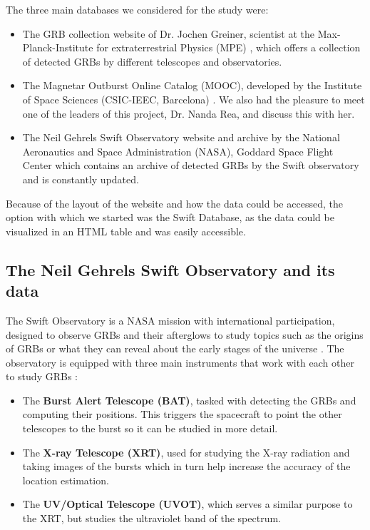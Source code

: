 The three main databases we considered for the study were:

\begin{itemize}
	\item The GRB collection website of Dr. Jochen Greiner, scientist at the Max-Planck-Institute for extraterrestrial Physics (MPE) \cite{greinergrb},  which offers a collection of detected GRBs by different telescopes and observatories.
	\item The Magnetar Outburst Online Catalog (MOOC), developed by the Institute of Space Sciences (CSIC-IEEC, Barcelona) \cite{moocgrbs}. We also had the pleasure to meet one of the leaders of this project, Dr. Nanda Rea, and discuss this with her.
	\item The Neil Gehrels Swift Observatory website and archive by the National Aeronautics and Space Administration (NASA), Goddard Space Flight Center \cite{swiftnasa} which contains an archive of detected GRBs by the Swift observatory and is constantly updated.
\end{itemize}

Because of the layout of the website and how the data could be accessed, the option with which we started was the Swift Database, as the data could be visualized in an HTML table and was easily accessible.

\subsection{The Neil Gehrels Swift Observatory and its data}

The Swift Observatory is a NASA mission with international participation, designed to observe GRBs and their afterglows to study topics such as the origins of GRBs or what they can reveal about the early stages of the universe \cite{roming2005swift}. The observatory is equipped with three main instruments that work with each other to study GRBs \cite{gehrels2004swift} \cite{swiftnasa}:

\begin{itemize}
	\item The \textbf{Burst Alert Telescope (BAT)}, tasked with detecting the GRBs and computing their positions. This triggers the spacecraft to point the other telescopes to the burst so it can be studied in more detail. 
	\item The \textbf{X-ray Telescope (XRT)}, used for studying the X-ray radiation and taking images of the bursts which in turn help increase the accuracy of the location estimation.
	\item The \textbf{UV/Optical Telescope (UVOT)}, which serves a similar purpose to the XRT, but studies the ultraviolet band of the spectrum. 
\end{itemize}

